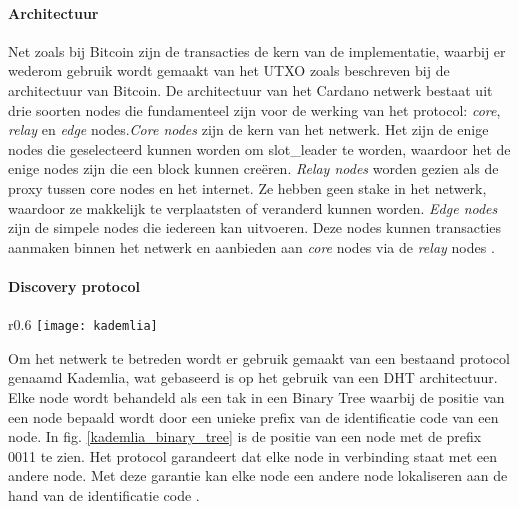 \paragraph{Architectuur}
Net zoals bij Bitcoin zijn de transacties de kern van de implementatie, waarbij er wederom gebruik wordt gemaakt van het \gls{UTXO} zoals beschreven bij de architectuur van Bitcoin. 
De architectuur van het Cardano netwerk bestaat uit drie soorten \glspl{node} die fundamenteel zijn voor de werking van het protocol: \textit{core}, \textit{relay} en \textit{edge} \glspl{node}.\textit{Core \glspl{node}} zijn de kern van het netwerk. Het zijn de enige \glspl{node} die geselecteerd kunnen worden om \gls{slot_leader} te worden, waardoor het de enige \glspl{node} zijn die een block kunnen creëren.
\textit{Relay \glspl{node}} worden gezien als de proxy tussen core \glspl{node} en het internet. Ze hebben geen stake in het netwerk, waardoor ze makkelijk te verplaatsten of veranderd kunnen worden.
\textit{Edge \glspl{node}} zijn de simpele \glspl{node} die iedereen kan uitvoeren. Deze \glspl{node} kunnen transacties aanmaken binnen het netwerk en aanbieden aan \textit{core} \glspl{node} via de \textit{relay} \glspl{node} \citep[Topology]{cardano_wiki}.

\paragraph{Discovery protocol}
\begin{wrapfigure}{r}{0.6\textwidth}
  \texttt{[image: kademlia]}
  \caption[Kademlia Binary Tree]{Binary Tree zoals in gebruik bij het Kademlia protocol, \cite{maymounkov2002kademlia}.}
  \label{kademlia_binary_tree}
\end{wrapfigure}

Om het netwerk te betreden wordt er gebruik gemaakt van een bestaand protocol genaamd Kademlia, wat gebaseerd is op het gebruik van een \acrfull{DHT} architectuur. Elke node wordt behandeld als een tak in een Binary Tree waarbij de positie van een \gls{node} bepaald wordt door een unieke prefix van de identificatie code van een \gls{node}. In fig. \ref{kademlia_binary_tree} is de positie van een \gls{node} met de prefix 0011 te zien. Het protocol garandeert dat elke \gls{node} in verbinding staat met een andere \gls{node}. Met deze garantie kan elke \gls{node} een andere \gls{node} lokaliseren aan de hand van de identificatie code \citep[p.~2]{maymounkov2002kademlia}.

